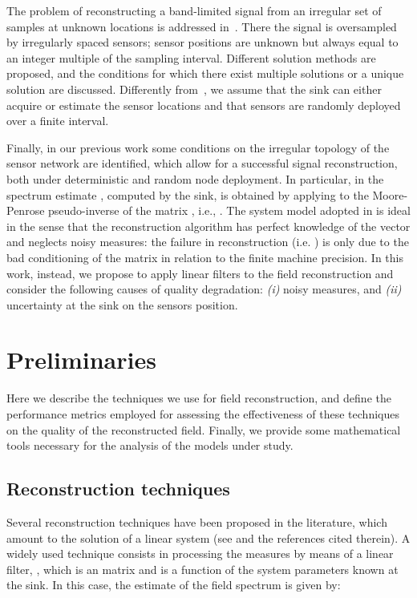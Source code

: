 \documentclass[final, a4paper]{IEEEtran}
\begin{document}
The problem of reconstructing a band-limited signal from an
irregular set of samples at unknown locations is addressed
in~\cite{Marziliano00}. There the signal is oversampled by
irregularly spaced sensors; sensor positions are unknown but always
equal to an integer multiple of the sampling interval. Different
solution methods are proposed, and the conditions for which there
exist multiple solutions or a unique solution are discussed.
Differently from~\cite{Marziliano00}, we assume that the sink can
either acquire or estimate the sensor locations and that sensors are
randomly deployed over a finite interval.

Finally, in our previous work \cite{NordioChiasseriniViterbo} some conditions
on the irregular topology of the sensor network are identified, which allow for
a successful signal reconstruction, both under deterministic and random
node deployment. In particular, in \cite{NordioChiasseriniViterbo} the
spectrum estimate ,
computed by the sink, is obtained by applying to  the
Moore-Penrose pseudo-inverse of the matrix , i.e.,
.
The system model adopted in \cite{NordioChiasseriniViterbo} is ideal in the sense that
the reconstruction algorithm has perfect knowledge of the vector  and
neglects noisy measures: the failure in reconstruction (i.e. )
is only due to the bad conditioning of the matrix  in relation to the
finite machine precision.
In this work, instead, we propose to apply linear filters to the field reconstruction
and consider the following causes of quality degradation: {\em (i)}
noisy measures, and {\em (ii)} uncertainty at the sink on the sensors position.


\section{Preliminaries}
\label{sec:defs_perf}

Here we describe the techniques we use for field reconstruction,
and define the performance metrics employed for assessing
the effectiveness of these techniques on the quality of the reconstructed field.
Finally, we provide some mathematical tools necessary for the analysis of the
models under study.

\subsection{Reconstruction techniques}
Several reconstruction techniques have been proposed in the literature,
which  amount to the solution of a linear system
(see \cite{Feichtinger95,Grochenig99} and the references cited therein). A
widely used technique consists in processing the measures  by means of
a linear filter,
, which is an  matrix and is a function of the system parameters known
at the sink. In this case, the estimate of the field spectrum is given by:
\end{document}
